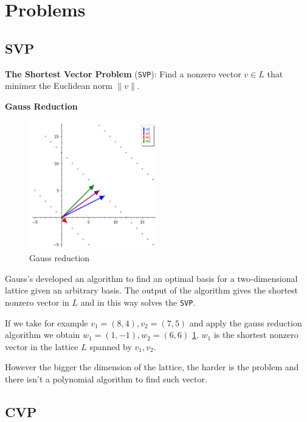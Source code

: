 \documentclass[a4paper,12pt]{report}
\begin{document}
\section{Problems}

\subsection{SVP}

\textbf{The Shortest Vector Problem} (\texttt{SVP}): Find a nonzero vector $v \in L$ that minimez the Euclidean norm $\lVert v \rVert$.

\begin{algorithm}
    \textbf{Gauss Reduction}
\end{algorithm}

\begin{figure}[b]
    \centering
    \includegraphics[width=0.5\textwidth]{./img/gauss_svp.png}
    \caption{Gauss reduction}
    \label{fig:gauss_svp}
\end{figure}

Gauss's developed an algorithm to find an optimal basis for a two-dimensional lattice given an arbitrary basis. The output of the algorithm
gives the shortest nonzero vector in $L$ and in this way solves the \texttt{SVP}.

If we take for example $v_1 = (8, 4), v_2 = (7, 5)$ and apply the gauss reduction algorithm we
obtain $w_1 = (1, -1), w_2 = (6, 6)$ \ref{fig:gauss_svp}. $w_1$ is the shortest nonzero vector in the lattice $L$ spanned by $v_1, v_2$.

However the bigger the dimension of the lattice, the harder is the problem and there isn't a polynomial algorithm to find such vector.

\subsection{CVP}
\end{document}

